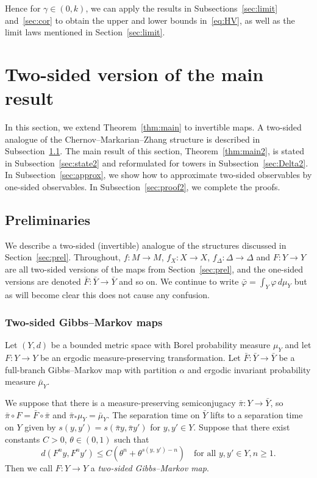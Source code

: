 \documentclass[AHL,Unicode,longabstracts,published]{cedram}
\newcommand{\bY}{\bar{Y}}
\newcommand{\bF}{\bar{F}}
\newcommand{\bvarphi}{\bar{\varphi}}
\begin{document}
Hence for $\gamma\in(0,k)$, we can apply the results in Subsections~\ref{sec:limit} and~\ref{sec:cor} to obtain the upper and lower bounds in~\eqref{eq:HV}, as well as the limit laws mentioned in Section~\ref{sec:limit}.


\section{Two-sided version of the main result}\label{sec:main2}

In this section, we extend Theorem~\ref{thm:main} to invertible maps. A two-sided analogue of the Chernov--Markarian--Zhang structure is described in Subsection~\ref{sec:prel2}. The main result of this section, Theorem~\ref{thm:main2}, is stated in Subsection~\ref{sec:state2} and reformulated for towers in Subsection~\ref{sec:Delta2}. In Subsection~\ref{sec:approx}, we show how to approximate two-sided observables by one-sided observables. In Subsection~\ref{sec:proof2}, we complete the proofs.


\subsection{Preliminaries}\label{sec:prel2}

We describe a two-sided (invertible) analogue of the structures discussed in Section~\ref{sec:prel}. Throughout, $f:M\to M$, $f_X:X\to X$, $f_\Delta:\Delta\to\Delta$ and $F:Y\to Y$ are all two-sided versions of the maps from Section~\ref{sec:prel}, and the one-sided versions are denoted $\bF:\bY\to\bY$ and so on. We continue to write $\bvarphi=\int_Y\varphi\,d\mu_Y$ but as will become clear this does not cause any confusion.

\subsubsection*{Two-sided Gibbs--Markov maps}

Let $(Y,d)$ be a bounded metric space with Borel probability measure $\mu_Y$ and let $F:Y\to Y$ be an ergodic measure-preserving transformation. Let $\bF:\bY\to\bY$ be a full-branch Gibbs--Markov map with partition $\alpha$ and ergodic invariant probability measure $\bar\mu_Y$.

We suppose that there is a measure-preserving semiconjugacy $\bar\pi:Y\to\bY$, so $\bar\pi\circ F=\bF\circ\bar\pi$ and $\bar\pi_*\mu_Y=\bar\mu_Y$. The separation time on $\bY$ lifts to a separation time on $Y$ given by $s(y,y')=s(\bar\pi y,\bar\pi y')$ for $y,y'\in Y$. Suppose that there exist constants $C>0$, $\theta\in(0,1)$ such that
\begin{equation}\label{eq:prod}
d\left(F^ny,F^ny'\right)\le C\left(\theta^n+\theta^{s(y,\,y')-n}\right)
\quad\text{for all }y,y'\in Y, n\ge1.
\end{equation}
Then we call $F:Y\to Y$ a \emph{two-sided Gibbs--Markov map}.
\end{document}
